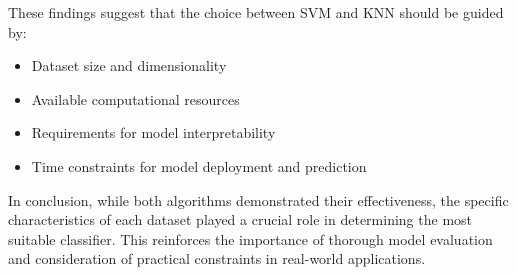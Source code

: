 These findings suggest that the choice between SVM and KNN should be guided by:
\begin{itemize}
    \item Dataset size and dimensionality
    \item Available computational resources
    \item Requirements for model interpretability
    \item Time constraints for model deployment and prediction
\end{itemize}

In conclusion, while both algorithms demonstrated their effectiveness, the specific characteristics of each dataset played a crucial role in determining the most suitable classifier. This reinforces the importance of thorough model evaluation and consideration of practical constraints in real-world applications.
